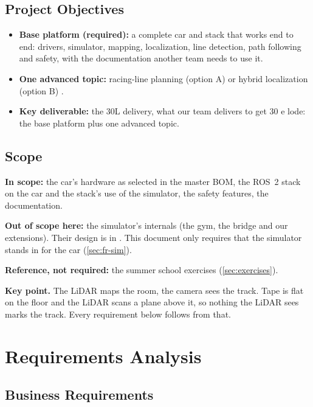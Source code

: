 \documentclass[11pt,a4paper]{article}
\begin{document}
\subsection{Project Objectives}
\begin{itemize}
  \item \textbf{Base platform (required):} a complete car and stack that works end to end: drivers, simulator, mapping, localization, line detection, path following and safety, with the documentation another team needs to use it.
  \item \textbf{One advanced topic:} racing-line planning (option A) or hybrid localization (option B) \tbd[OI-01].
  \item \textbf{Key deliverable:} the 30L delivery, what our team delivers to get 30 e lode: the base platform plus one advanced topic.
\end{itemize}

\subsection{Scope}
\textbf{In scope:} the car's hardware as selected in the master BOM, the ROS~2 stack on the car and the stack's use of the simulator, the safety features, the documentation.

\textbf{Out of scope here:} the simulator's internals (the gym, the bridge and our  extensions). Their design is in . This document only requires that the simulator stands in for the car (\cref{sec:fr-sim}).

\textbf{Reference, not required:} the summer school exercises (\cref{sec:exercises}).

\begin{takeaway}
\textbf{Key point.} The LiDAR maps the room, the camera sees the track. Tape is flat on the floor and the LiDAR scans a plane above it, so nothing the LiDAR sees marks the track. Every requirement below follows from that.
\end{takeaway}

\section{Requirements Analysis}
\subsection{Business Requirements}
\end{document}
